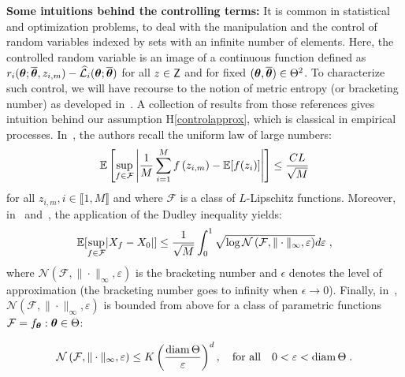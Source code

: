 \documentclass[final,12pt]{alt2022} %
\begin{document}
\textbf{Some intuitions behind the controlling terms:} It is  common in statistical and optimization problems, to deal with the manipulation and the control of random variables indexed by sets with an infinite number of elements. Here, the controlled random variable is an image of a continuous function defined as $r_i (\param ; \op, z_{i,m})  - \sur{i}{\param}{\op}$ for all $z \in \Zset$ and for fixed $(\param, \op) \in \Param^2$.
To characterize such control, we will have recourse to the notion of metric entropy (or bracketing number) as developed in~\cite{van2000asymptotic,vershynin2018high,wainwright2019high}.
A collection of results from those references gives intuition behind our assumption H\ref{controlapprox}, which is classical in empirical processes.
In~\cite[Theorem 8.2.3]{vershynin2018high}, the authors recall the uniform law of large numbers:\vspace{0.05in}
{\small$$\EE \left[\underset{f \in \mathcal{F}}{ \sup } \left|\frac{1}{M} \sum_{i=1}^{M} f\left(z_{i,m}\right)-\EE[f(z_i)]\right| \right] \leq \frac{C L}{\sqrt{M}} $$}
\vspace{0.05in}
for all $z_{i,m}, i \in \llbracket 1, M \rrbracket$ and where $\mathcal{F}$ is a class of $L$-Lipschitz functions.
Moreover, in~\cite[Theorem 8.1.3 ]{vershynin2018high} and~\cite[Theorem 5.22]{wainwright2019high}, the application of the Dudley inequality yields:
\vspace{0.05in}
{\small$$\EE [ \underset{f \in \mathcal{F}}{\sup} |X_{f}-X_{0} | ] \leq \frac{1}{\sqrt{M}} \int_{0}^{1} \sqrt{\log \mathcal{N}\left(\mathcal{F},\|\cdot\|_{\infty}, \varepsilon\right)} d \varepsilon\eqsp,$$}
\vspace{0.05in}
where $\mathcal{N}\left(\mathcal{F},\|\cdot\|_{\infty}, \varepsilon\right)$ is the bracketing number and $\epsilon$ denotes the level of approximation (the bracketing number goes to infinity when $\epsilon  \to 0$). Finally, in~\cite[p.271, Example]{van2000asymptotic}, $\mathcal{N}\left(\mathcal{F},\|\cdot\|_{\infty}, \varepsilon\right)$ is bounded from above for a class of parametric functions $ \mathcal{F}= {f_{\param}: \param \in \Param}$:

{\small$$\mathcal{N}\left(\mathcal{F},\|\cdot\|_{\infty}, \varepsilon\right) \leq K\left(\frac{\operatorname{diam} \Theta}{\varepsilon}\right)^{d},  \quad \textrm{for all} \quad 0<\varepsilon<\operatorname{diam} \Theta\eqsp.
$$}
\end{document}
